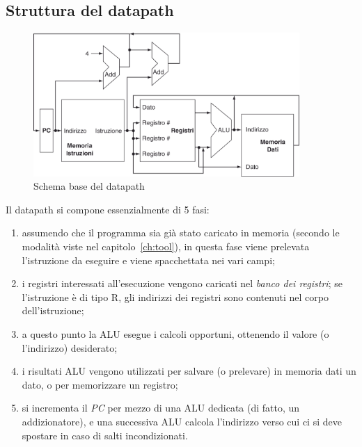 \documentclass[class=book, crop=false, oneside]{standalone}
\begin{document}
\subsection{Struttura del datapath}
\begin{figure}[H]
	\centering
	\includegraphics[width=0.9\textwidth,keepaspectratio]{datap_1}
	\caption{Schema base del datapath}
\end{figure}
Il datapath si compone essenzialmente di 5 fasi:
\begin{enumerate}
  \item assumendo che il programma sia già stato caricato in memoria (secondo le modalità viste nel capitolo~\ref{ch:tool}), in questa fase viene prelevata l'istruzione da eseguire e viene spacchettata nei vari campi;
  \item i registri interessati all'esecuzione vengono caricati nel \emph{banco dei registri}; se l'istruzione è di tipo R, gli indirizzi dei registri sono contenuti nel corpo dell'istruzione;
  \item a questo punto la ALU esegue i calcoli opportuni, ottenendo il valore (o l'indirizzo) desiderato;
  \item i risultati ALU vengono utilizzati per salvare (o prelevare) in memoria dati un dato, o per memorizzare un registro;
  \item si incrementa il \emph{PC} per mezzo di una ALU dedicata (di fatto, un addizionatore), e una successiva ALU calcola l’indirizzo verso cui ci si deve spostare in caso di salti incondizionati.
\end{enumerate}
\end{document}
